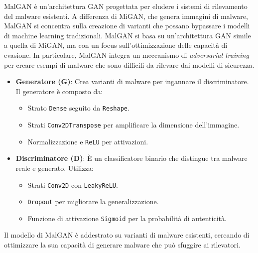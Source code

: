 MalGAN è un'architettura GAN progettata per eludere i sistemi di rilevamento del malware esistenti. A differenza di MiGAN, che genera immagini di malware, MalGAN si concentra sulla creazione di varianti che possano bypassare i modelli di machine learning tradizionali.
MalGAN si basa su un'architettura GAN simile a quella di MiGAN, ma con un focus sull'ottimizzazione delle capacità di evasione. In particolare, MalGAN integra un meccanismo di \textit{adversarial training} per creare esempi di malware che sono difficili da rilevare dai modelli di sicurezza.
\begin{itemize}
    \item \textbf{Generatore (G)}: Crea varianti di malware per ingannare il discriminatore. Il generatore è composto da:
    \begin{itemize}
        \item Strato \texttt{Dense} seguito da \texttt{Reshape}.
        \item Strati \texttt{Conv2DTranspose} per amplificare la dimensione dell'immagine.
        \item Normalizzazione e \texttt{ReLU} per attivazioni.
    \end{itemize}
    \item \textbf{Discriminatore (D)}: È un classificatore binario che distingue tra malware reale e generato. Utilizza:
    \begin{itemize}
        \item Strati \texttt{Conv2D} con \texttt{LeakyReLU}.
        \item \texttt{Dropout} per migliorare la generalizzazione.
        \item Funzione di attivazione \texttt{Sigmoid} per la probabilità di autenticità.
    \end{itemize}
\end{itemize}
Il modello di MalGAN è addestrato su varianti di malware esistenti, cercando di ottimizzare la sua capacità di generare malware che può sfuggire ai rilevatori.

